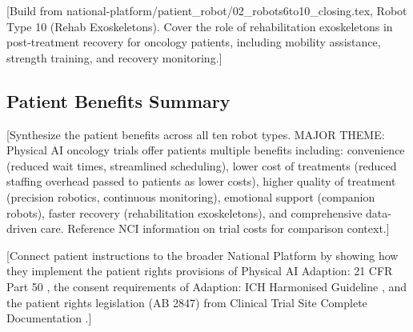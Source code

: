 [Build from national-platform/patient\_robot/02\_robots6to10\_closing.tex,
Robot Type 10 (Rehab Exoskeletons). Cover the role of rehabilitation
exoskeletons in post-treatment recovery for oncology patients, including
mobility assistance, strength training, and recovery monitoring.]

\subsection{Patient Benefits Summary}
\label{subsec:instructions-benefits}

[Synthesize the patient benefits across all ten robot types. MAJOR THEME:
Physical AI oncology trials offer patients multiple benefits including:
convenience (reduced wait times, streamlined scheduling), lower cost of
treatments (reduced staffing overhead passed to patients as lower costs),
higher quality of treatment (precision robotics, continuous monitoring),
emotional support (companion robots), faster recovery (rehabilitation
exoskeletons), and comprehensive data-driven care. Reference NCI information
on trial costs \cite{nci-trials-paying} for comparison context.]

[Connect patient instructions to the broader National Platform by showing
how they implement the patient rights provisions of Physical AI Adaption:
21 CFR Part 50 \cite{cfr50-adapt}, the consent requirements of Adaption: ICH
Harmonised Guideline \cite{ich-adapt}, and the patient rights legislation
(AB 2847) from Clinical Trial Site Complete Documentation \cite{site-docs}.]
